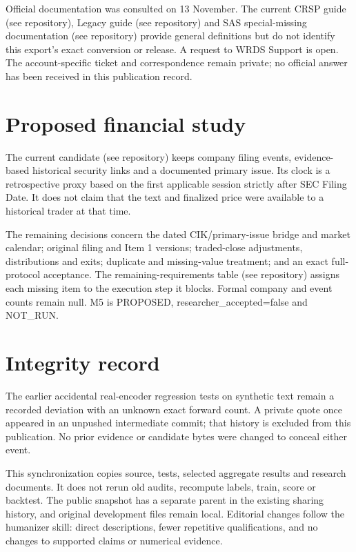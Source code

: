 \documentclass[11pt]{article}
\begin{document}
Official documentation was consulted on 13 November. The current CRSP guide (see repository), Legacy guide (see repository) and SAS special-missing documentation (see repository) provide general definitions but do not identify this export's exact conversion or release. A request to WRDS Support is open. The account-specific ticket and correspondence remain private; no official answer has been received in this publication record.

\section*{Proposed financial study}

The current candidate (see repository) keeps company filing events, evidence-based historical security links and a documented primary issue. Its clock is a retrospective proxy based on the first applicable session strictly after SEC Filing Date. It does not claim that the text and finalized price were available to a historical trader at that time.

The remaining decisions concern the dated CIK/primary-issue bridge and market calendar; original filing and Item 1 versions; traded-close adjustments, distributions and exits; duplicate and missing-value treatment; and an exact full-protocol acceptance. The remaining-requirements table (see repository) assigns each missing item to the execution step it blocks. Formal company and event counts remain null. M5 is PROPOSED, researcher\_accepted=false and NOT\_RUN.

\section*{Integrity record}

The earlier accidental real-encoder regression tests on synthetic text remain a recorded deviation with an unknown exact forward count. A private quote once appeared in an unpushed intermediate commit; that history is excluded from this publication. No prior evidence or candidate bytes were changed to conceal either event.

This synchronization copies source, tests, selected aggregate results and research documents. It does not rerun old audits, recompute labels, train, score or backtest. The public snapshot has a separate parent in the existing sharing history, and original development files remain local. Editorial changes follow the humanizer skill: direct descriptions, fewer repetitive qualifications, and no changes to supported claims or numerical evidence.
\end{document}

